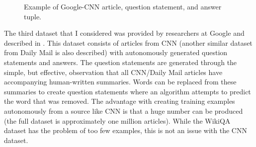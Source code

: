 \documentclass{article}
\begin{document}
\begin{figure}[ht]
\begin{minipage}[b]{0.45\linewidth}
		\caption{Example of Google-CNN article, question statement, and answer tuple.}
		\label{fig:google-cnn}
\end{minipage}
\end{figure}

The third dataset that I considered was provided by researchers at Google and described in \cite{goog_cnn}.  This dataset consists of articles from CNN (another similar dataset from Daily Mail is also described) with autonomously generated question statements and answers.  The question statements are generated through the simple, but effective, observation that all CNN/Daily Mail articles have accompanying human-written summaries.  Words can be replaced from these summaries to create question statements where an algorithm attempts to predict the word that was removed.  The advantage with creating training examples autonomously from a source like CNN is that a huge number can be produced (the full dataset is approximately one million articles).  While the WikiQA dataset has the problem of too few examples, this is not an issue with the CNN dataset.  

 







\nocite{*}


\end{document}
